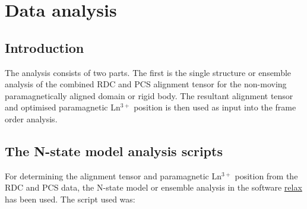 
\section{Data analysis}

\subsection{Introduction}

The analysis consists of two parts.
The first is the single structure or ensemble analysis of the combined RDC and PCS alignment tensor for the non-moving paramagnetically aligned domain or rigid body.
The resultant alignment tensor and optimised paramagnetic Ln$^{3+}$ position is then used as input into the frame order analysis.


\subsection{The N-state model analysis scripts}
\label{sect: N-state model analysis scripts}

For determining the alignment tensor and paramagnetic Ln$^{3+}$ position from the RDC and PCS data, the N-state model or ensemble analysis in the software \href{http://www.nmr-relax.com}{relax} has been used.
The script used was:

